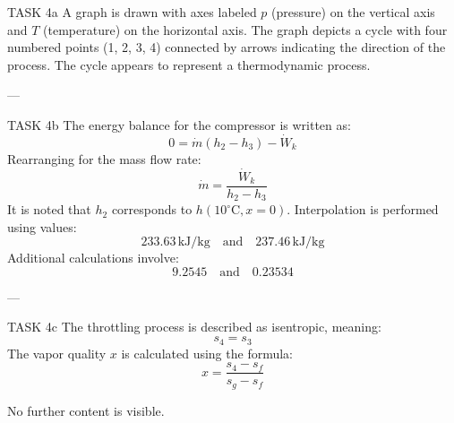 TASK 4a  
A graph is drawn with axes labeled \( p \) (pressure) on the vertical axis and \( T \) (temperature) on the horizontal axis. The graph depicts a cycle with four numbered points (1, 2, 3, 4) connected by arrows indicating the direction of the process. The cycle appears to represent a thermodynamic process.

---

TASK 4b  
The energy balance for the compressor is written as:  
\[
0 = \dot{m} (h_2 - h_3) - \dot{W}_k
\]  
Rearranging for the mass flow rate:  
\[
\dot{m} = \frac{\dot{W}_k}{h_2 - h_3}
\]  
It is noted that \( h_2 \) corresponds to \( h(10^\circ\text{C}, x = 0) \). Interpolation is performed using values:  
\[
233.63 \, \text{kJ/kg} \quad \text{and} \quad 237.46 \, \text{kJ/kg}
\]  
Additional calculations involve:  
\[
9.2545 \quad \text{and} \quad 0.23534
\]  

---

TASK 4c  
The throttling process is described as isentropic, meaning:  
\[
s_4 = s_3
\]  
The vapor quality \( x \) is calculated using the formula:  
\[
x = \frac{s_4 - s_f}{s_g - s_f}
\]  

No further content is visible.